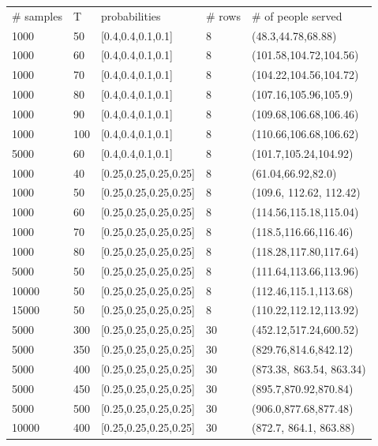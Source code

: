 \begin{table}[ht]
  \begin{tabular}{l|l|l|l|l}
  \hline
  \# samples & T & probabilities & \# rows &  \# of people served \\
  1000  & 50  & [0.4,0.4,0.1,0.1] & 8 & (48.3,44.78,68.88) \\
  1000  & 60  & [0.4,0.4,0.1,0.1] & 8 & (101.58,104.72,104.56) \\
  1000  & 70  & [0.4,0.4,0.1,0.1] & 8 & (104.22,104.56,104.72) \\
  1000  & 80  & [0.4,0.4,0.1,0.1] & 8 & (107.16,105.96,105.9) \\
  1000  & 90  & [0.4,0.4,0.1,0.1] & 8 & (109.68,106.68,106.46) \\
  1000  & 100  & [0.4,0.4,0.1,0.1] & 8 & (110.66,106.68,106.62) \\
  5000  & 60  & [0.4,0.4,0.1,0.1] & 8 & (101.7,105.24,104.92) \\
  \hline
  1000  & 40  & [0.25,0.25,0.25,0.25] & 8 & (61.04,66.92,82.0) \\
  1000  & 50  & [0.25,0.25,0.25,0.25] & 8 & (109.6, 112.62, 112.42) \\
  1000  & 60  & [0.25,0.25,0.25,0.25] & 8 & (114.56,115.18,115.04) \\
  1000  & 70  & [0.25,0.25,0.25,0.25] & 8 & (118.5,116.66,116.46) \\
  1000  & 80  & [0.25,0.25,0.25,0.25] & 8 & (118.28,117.80,117.64) \\
  5000  & 50  & [0.25,0.25,0.25,0.25] & 8 & (111.64,113.66,113.96) \\
  10000  & 50  & [0.25,0.25,0.25,0.25] & 8 & (112.46,115.1,113.68) \\
  15000  & 50  & [0.25,0.25,0.25,0.25] & 8 & (110.22,112.12,113.92) \\
  \hline
  5000  & 300  & [0.25,0.25,0.25,0.25] & 30 & (452.12,517.24,600.52) \\
  5000  & 350  & [0.25,0.25,0.25,0.25] & 30 & (829.76,814.6,842.12) \\
  5000  & 400  & [0.25,0.25,0.25,0.25] & 30 & (873.38, 863.54, 863.34) \\
  5000  & 450  & [0.25,0.25,0.25,0.25] & 30 & (895.7,870.92,870.84) \\
  5000  & 500  & [0.25,0.25,0.25,0.25] & 30 & (906.0,877.68,877.48) \\
  10000  & 400  & [0.25,0.25,0.25,0.25] & 30 & (872.7, 864.1, 863.88) \\
  \hline
  \end{tabular}
\end{table}


